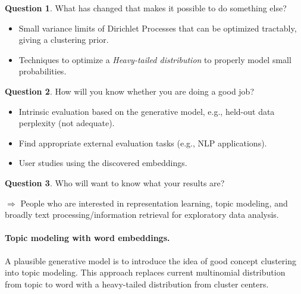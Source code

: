 \documentclass[11pt]{article}
\theoremstyle{plain} \numberwithin{equation}{section}
\theoremstyle{definition}
\newtheorem{question}{Question}
\newcounter{list}
\begin{document}
\begin{question}{What has changed that makes it possible to do something else?}\end{question}
\vspace{-10px}
\begin{itemize}
  \vspace{-10px}
  \setlength\itemsep{1px}
  \setlength{\itemindent}{0.4in}
  \item Small variance limits of Dirichlet Processes that can be optimized tractably, giving a clustering prior.
  \item Techniques to optimize a \textit{Heavy-tailed distribution} to properly model small probabilities. 
\end{itemize}
\vspace{3px}


\begin{question}{How will you know whether you are doing a good job?}\end{question}
\vspace{-10px}
\begin{itemize}
  \vspace{-10px}
  \setlength\itemsep{1px}
  \setlength{\itemindent}{0.4in}
  \item Intrinsic evaluation based on the generative model, e.g., held-out data perplexity (not adequate).
  \item Find appropriate external evaluation tasks (e.g., NLP applications).
  \item User studies using the discovered embeddings.
\end{itemize}
\vspace{3px}


\begin{question}{Who will want to know what your results are?}\end{question}
\vspace{-10px}
$\Rightarrow$ People who are interested in representation learning, topic modeling,
and broadly text processing/information retrieval for exploratory data analysis.

\paragraph{Topic modeling with word embeddings.} A plausible generative model is to introduce the idea of
good concept clustering into topic modeling.
This approach replaces current multinomial distribution from topic to word with a heavy-tailed distribution from cluster centers.

% 
% 
\end{document}
